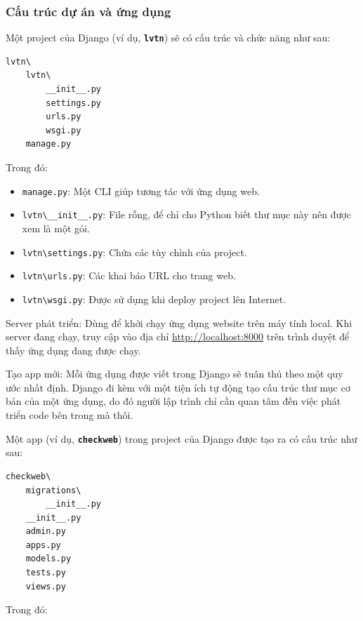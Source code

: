 \subsubsection{Cấu trúc dự án và ứng dụng}
Một project của Django (ví dụ, \textbf{\texttt{lvtn}}) sẽ có cấu trúc và chức năng như sau:
\begin{lstlisting}
lvtn\
	lvtn\
		__init__.py
		settings.py
		urls.py
		wsgi.py
	manage.py
\end{lstlisting}
\par
Trong đó:
\begin{itemize}
	\item \texttt{manage.py}: Một CLI giúp tương tác với ứng dụng web.
	\item \texttt{lvtn\textbackslash\_\_init\_\_.py}: File rỗng, để chỉ cho Python biết thư mục này nên được xem là một gói.
	\item \texttt{lvtn\textbackslash settings.py}: Chứa các tùy chỉnh của project.
	\item \texttt{lvtn\textbackslash urls.py}: Các khai báo URL cho trang web.
	\item \texttt{lvtn\textbackslash wsgi.py}: Được sử dụng khi deploy project lên Internet.
\end{itemize}
\par
Server phát triển: Dùng để khởi chạy ứng dụng website trên máy tính local. Khi server đang chạy, truy cập vào địa chỉ \url{http://localhost:8000} trên trình duyệt để thấy ứng dụng đang được chạy.
\par
Tạo app mới: Mỗi ứng dụng được viết trong Django sẽ tuân thủ theo một quy ước nhất định. Django đi kèm với một tiện ích tự động tạo cấu trúc thư mục cơ bản của một ứng dụng, do đó người lập trình chỉ cần quan tâm đến việc phát triển code bên trong mà thôi.
\par
Một app (ví dụ, \textbf{\texttt{checkweb}}) trong project của Django được tạo ra có cấu trúc như sau:
\begin{lstlisting}
checkweb\
	migrations\
		__init__.py
	__init__.py
	admin.py
	apps.py
	models.py
	tests.py
	views.py
\end{lstlisting}
\par
Trong đó:

